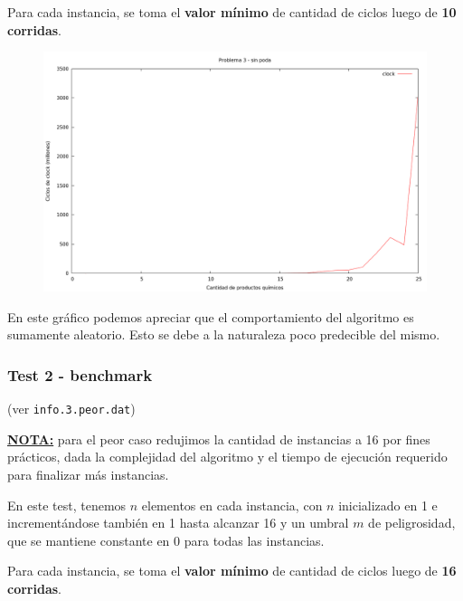 Para cada instancia, se toma el \textbf{valor mínimo} de cantidad de ciclos luego de \textbf{10 corridas}.

\vspace*{0.5cm}

\begin{figure}[h]
  \begin{center}
    \includegraphics[scale=0.35]{imagenes/grafico-3-pelado.png}
  \end{center}
\end{figure}

\vspace*{0.5cm}

En este gráfico podemos apreciar que el comportamiento del algoritmo es
sumamente aleatorio. Esto se debe a la naturaleza poco predecible del mismo.


\newpage
\subsubsection{Test 2 - benchmark }

(ver \verb|info.3.peor.dat|) \medskip

\underline{\textbf{NOTA:}} para el peor caso redujimos la cantidad de instancias a 16 por fines prácticos, dada la complejidad
del algoritmo y el tiempo de ejecución requerido para finalizar más instancias. \medskip

En este test, tenemos $n$ elementos en cada instancia, con $n$ inicializado en 1 e incrementándose
también en 1 hasta alcanzar 16 y un umbral $m$ de peligrosidad, que se mantiene constante en 0 para todas las
instancias.

Para cada instancia, se toma el \textbf{valor mínimo} de cantidad de ciclos luego de \textbf{16 corridas}.

